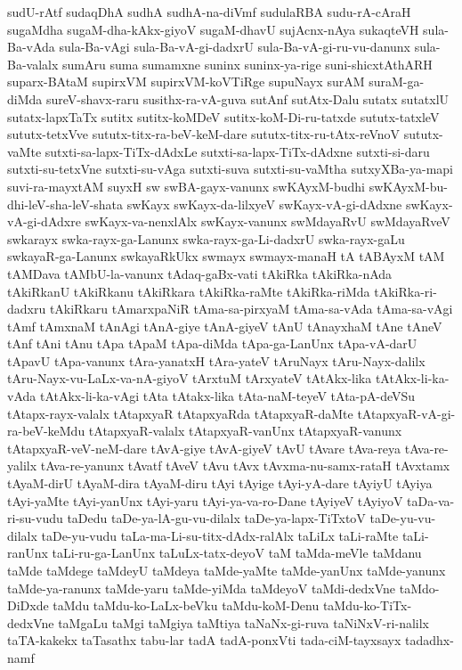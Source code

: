 {sudU-rAtf
sudaqDhA
sudhA
sudhA-na-diVmf
sudulaRBA
sudu-rA-cAraH
sugaMdha
sugaM-dha-kAkx-giyoV
sugaM-dhavU
sujAcnx-nAya
sukaqteVH
sula-Ba-vAda
sula-Ba-vAgi
sula-Ba-vA-gi-dadxrU
sula-Ba-vA-gi-ru-vu-danunx
sula-Ba-valalx
sumAru
suma
sumamxne
suninx
suninx-ya-rige
suni-shicxtAthARH
suparx-BAtaM
supirxVM
supirxVM-koVTiRge
supuNayx
surAM
suraM-ga-diMda
sureV-shavx-raru
susithx-ra-vA-guva
sutAnf
sutAtx-Dalu
sutatx
sutatxlU
sutatx-lapxTaTx
sutitx
sutitx-koMDeV
sutitx-koM-Di-ru-tatxde
sututx-tatxleV
sututx-tetxVve
sututx-titx-ra-beV-keM-dare
sututx-titx-ru-tAtx-reVnoV
sututx-vaMte
sutxti-sa-lapx-TiTx-dAdxLe
sutxti-sa-lapx-TiTx-dAdxne
sutxti-si-daru
sutxti-su-tetxVne
sutxti-su-vAga
sutxti-suva
sutxti-su-vaMtha
sutxyXBa-ya-mapi
suvi-ra-mayxtAM
suyxH
sw
swBA-gayx-vanunx
swKAyxM-budhi
swKAyxM-bu-dhi-leV-sha-leV-shata
swKayx
swKayx-da-lilxyeV
swKayx-vA-gi-dAdxne
swKayx-vA-gi-dAdxre
swKayx-va-nenxlAlx
swKayx-vanunx
swMdayaRvU
swMdayaRveV
swkarayx
swka-rayx-ga-Lanunx
swka-rayx-ga-Li-dadxrU
swka-rayx-gaLu
swkayaR-ga-Lanunx
swkayaRkUkx
swmayx
swmayx-manaH
tA
tABAyxM
tAM
tAMDava
tAMbU-la-vanunx
tAdaq-gaBx-vati
tAkiRka
tAkiRka-nAda
tAkiRkanU
tAkiRkanu
tAkiRkara
tAkiRka-raMte
tAkiRka-riMda
tAkiRka-ri-dadxru
tAkiRkaru
tAmarxpaNiR
tAma-sa-pirxyaM
tAma-sa-vAda
tAma-sa-vAgi
tAmf
tAmxnaM
tAnAgi
tAnA-giye
tAnA-giyeV
tAnU
tAnayxhaM
tAne
tAneV
tAnf
tAni
tAnu
tApa
tApaM
tApa-diMda
tApa-ga-LanUnx
tApa-vA-darU
tApavU
tApa-vanunx
tAra-yanatxH
tAra-yateV
tAruNayx
tAru-Nayx-dalilx
tAru-Nayx-vu-LaLx-va-nA-giyoV
tArxtuM
tArxyateV
tAtAkx-lika
tAtAkx-li-ka-vAda
tAtAkx-li-ka-vAgi
tAta
tAtakx-lika
tAta-naM-teyeV
tAta-pA-deVSu
tAtapx-rayx-valalx
tAtapxyaR
tAtapxyaRda
tAtapxyaR-daMte
tAtapxyaR-vA-gi-ra-beV-keMdu
tAtapxyaR-valalx
tAtapxyaR-vanUnx
tAtapxyaR-vanunx
tAtapxyaR-veV-neM-dare
tAvA-giye
tAvA-giyeV
tAvU
tAvare
tAva-reya
tAva-re-yalilx
tAva-re-yanunx
tAvatf
tAveV
tAvu
tAvx
tAvxma-nu-samx-rataH
tAvxtamx
tAyaM-dirU
tAyaM-dira
tAyaM-diru
tAyi
tAyige
tAyi-yA-dare
tAyiyU
tAyiya
tAyi-yaMte
tAyi-yanUnx
tAyi-yaru
tAyi-ya-va-ro-Dane
tAyiyeV
tAyiyoV
taDa-va-ri-su-vudu
taDedu
taDe-ya-lA-gu-vu-dilalx
taDe-ya-lapx-TiTxtoV
taDe-yu-vu-dilalx
taDe-yu-vudu
taLa-ma-Li-su-titx-dAdx-ralAlx
taLiLx
taLi-raMte
taLi-ranUnx
taLi-ru-ga-LanUnx
taLuLx-tatx-deyoV
taM
taMda-meVle
taMdanu
taMde
taMdege
taMdeyU
taMdeya
taMde-yaMte
taMde-yanUnx
taMde-yanunx
taMde-ya-ranunx
taMde-yaru
taMde-yiMda
taMdeyoV
taMdi-dedxVne
taMdo-DiDxde
taMdu
taMdu-ko-LaLx-beVku
taMdu-koM-Denu
taMdu-ko-TiTx-dedxVne
taMgaLu
taMgi
taMgiya
taMtiya
taNaNx-gi-ruva
taNiNxV-ri-nalilx
taTA-kakekx
taTasathx
tabu-lar
tadA
tadA-ponxVti
tada-ciM-tayxsayx
tadadhx-namf
}
